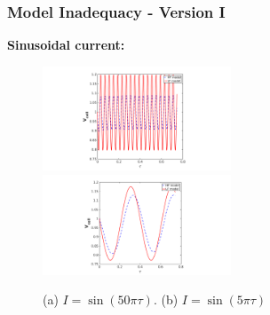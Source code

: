 \documentclass[10pt,xcolor=dvipsnames,compress]{beamer}
\begin{document}
\begin{frame}
\frametitle{Model Inadequacy - Version I}
\vfill

\textbf{Sinusoidal current:}

\begin{figure}[h]
    \centering
    \includegraphics[trim = 4.3in 0.2in 4.3in 0.2in, clip, width=0.5\textwidth]{figs/sin_qHF_w50pi.png} 
    ~
    \includegraphics[trim = 4.3in 0.2in 4.3in 0.2in, clip, width=0.5\textwidth]{figs/sin_qoi_w5pi.png} 
    \vspace{-4mm}
\caption{(a) $I = \sin (50\pi\tau)$. (b) $I = \sin (5\pi\tau)$}
\end{figure}


\vfill
\end{frame}
\end{document}
